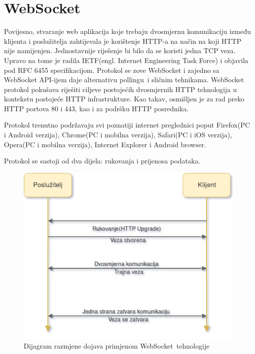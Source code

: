 \documentclass[times, utf8, zavrsni]{fer}
\begin{document}
\section{WebSocket}
Povijesno, stvaranje web aplikacija koje trebaju dvosmjernu komunikaciju između klijenta i poslužitelja zahtijevala je korištenje HTTP-a na način na koji HTTP nije namijenjen. Jednostavnije riješenje bi bilo da se koristi jedna TCP veza. Upravo na tome je radila IETF(engl. Internet Engineering Task Force) i objavila pod RFC 6455 specifikacijom. Protokol se zove WebSocket i zajedno sa WebSocket API-ijem daje alternativu \glqq pollingu\grqq\  i sličnim tehnikama. WebSocket protokol pokušava riješiti ciljeve postojećih dvosmjernih HTTP tehnologija u kontekstu postojeće HTTP infrastrukture. Kao takav, osmišljen je za rad preko HTTP portova 80 i 443, kao i za podršku HTTP posrednika.

Protokol trenutno podržavaju svi poznatiji internet preglednici poput Firefox(PC i Android verzija), Chrome(PC i mobilna verzija), Safari(PC i iOS verzija), Opera(PC i mobilna verzija), Internet Explorer i Android browser.

Protokol se sastoji od dva dijela: rukovanja i prijenosa podataka.

\begin{figure}[htb]
\centering
\includegraphics[width=14cm]{img/websocket.png}
\caption{Dijagram razmjene dojava primjenom \glqq WebSocket\grqq\  tehnologije}
\label{fig:websocket-image}
\end{figure}
\end{document}
